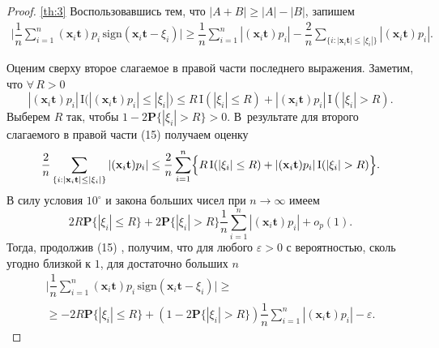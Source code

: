 \begin{proof}{\ref{th:3}}
Воспользовавшись тем, что $|A+B| \geq |A|-|B|$,  запишем 
\begin{multline} \label{P7}
 \biggl| \dfrac 1n \sum_{i=1}^n (\mathbf{x}_{i}\mathbf{t})p_{i} \,
 \mathrm{sign}\left(\mathbf{x}_{i}\mathbf{t}-\xi_{i}\right)\biggr|
 \geq \dfrac 1n \sum_{i=1}^n |(\mathbf{x}_{i}\mathbf{t})p_{i}| - \dfrac 2n
 \sum_{\{i:\left|\mathbf{x}_{i}\mathbf{t}\right| \leq |\xi_{i}|\}}
 |(\mathbf{x}_{i}\mathbf{t})p_{i}|.
\end{multline}

Оценим сверху второе слагаемое в правой части последнего
выражения. Заметим, что $\forall \, R>0$
$$|(\mathbf{x}_{i}\mathbf{t})p_{i}|\,\mathrm{I}
\bigl(|(\mathbf{x}_{i}\mathbf{t})p_{i}| \leq |\xi_{i}|\bigr) \leq R \,\mathrm{I}(|\xi_{i}|\leq R) +
|(\mathbf{x}_{i}\mathbf{t})p_{i}|\,\mathrm{I}(|\xi_{i}|> R).$$
Выберем $R$ так, чтобы $1-2\mathbf{P}\{ |\xi_{i}|> R \}>0$. 
В~результате для второго слагаемого в правой части (15) %
получаем оценку $$\dfrac 2n
\sum_{\{i:\left|\mathbf{x}_{i}\mathbf{t}\right| \leq |\xi_{i}|\}}
|(\mathbf{x}_{i}\mathbf{t})p_{i}| \leq \dfrac 2n \sum_{i=1}^n
\Bigl\{R \,\mathrm{I}(|\xi_{i}|\leq R) +
|(\mathbf{x}_{i}\mathbf{t})p_{i}|\,\mathrm{I}(|\xi_{i}|>
R)\Bigr\}.$$ В силу условия $10^{\circ}$ и закона больших чисел 
при $n \rightarrow \infty$ имеем %
$$2R\mathbf{P}\{ |\xi_{i}|\leq R \} + 2\mathbf{P}\{ |\xi_{i}|>R \}
\dfrac 1n \sum_{i=1}^n |(\mathbf{x}_{i}\mathbf{t})p_{i}| +
o_{p}(1).$$ Тогда, продолжив (15)%
, получим, что для любого
$\varepsilon > 0$ с вероятностью, сколь угодно близкой к $1$, для
достаточно больших $n$
\begin{multline} \label{P8}
\biggl| \dfrac 1n \sum_{i=1}^n (\mathbf{x}_{i}\mathbf{t})p_{i} \,
\mathrm{sign}\left(\mathbf{x}_{i}\mathbf{t}-\xi_{i}\right)\biggr|
\geq \\
\geq -2R\mathbf{P}\{ |\xi_{i}|\leq R \} +
(1-2\mathbf{P}\{ |\xi_{i}|>R \}) \dfrac 1n \sum_{i=1}^n
|(\mathbf{x}_{i}\mathbf{t})p_{i}| - \varepsilon.
\end{multline}


\end{proof}
